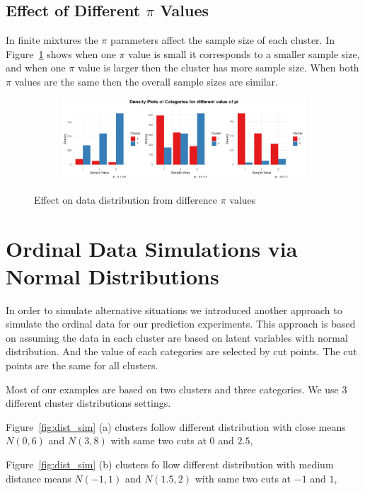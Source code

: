 \documentclass{article}
\begin{document}
\clearpage

\subsection{Effect of Different $\pi$ Values}
In finite mixtures the $\pi$ parameters affect the sample size of each cluster. 
In Figure~\ref{fig:pi} shows when one $\pi$ value is small it corresponds to a smaller sample size, and when one $\pi$ value is larger then the cluster has more sample size.
When both $\pi$ values are the same then the overall sample sizes are similar.
\begin{figure}[htbp!]
  \centering
  \begin{subfigure}{1.0\textwidth}
      \centering
      \includegraphics[width=\textwidth]{images/para_sim/pi.png}
  \end{subfigure}
  \caption{Effect on data distribution from difference $\pi$ values}
  \label{fig:pi}
\end{figure}

\section{Ordinal Data Simulations via Normal Distributions}

In order to simulate alternative situations
 we introduced another approach to simulate the ordinal data 
for our prediction experiments. 
This approach is based on assuming the data in each cluster are based on latent variables with normal distribution.
And the value of each categories are selected by cut points. The cut points are the same for all clusters.

Most of our examples are based on two clusters and three categories. We use 3 different cluster distributions settings.

Figure~\ref*{fig:dist_sim} (a) clusters follow different distribution with close means $N(0,6)$ and $N(3,8)$
with same two cuts at $0$ and $2.5$,

Figure~\ref*{fig:dist_sim} (b) clusters fo llow different distribution with medium distance means $N(-1,1)$ and $N(1.5,2)$
with same two cuts at $-1$ and $1$,
\end{document}
